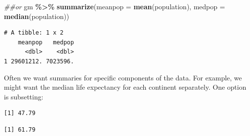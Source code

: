 \documentclass[
]{krantz}
\makeatletter
\newenvironment{Shaded}{\begin{snugshade}}{\end{snugshade}}
\newcommand{\CommentTok}[1]{\textcolor[rgb]{0.37,0.37,0.37}{\textit{#1}}}
\newcommand{\DataTypeTok}[1]{\textcolor[rgb]{0.27,0.27,0.27}{#1}}
\newcommand{\KeywordTok}[1]{\textcolor[rgb]{0.27,0.27,0.27}{\textbf{#1}}}
\newcommand{\NormalTok}[1]{#1}
\newcommand{\OperatorTok}[1]{\textcolor[rgb]{0.43,0.43,0.43}{\textbf{#1}}}
\newcommand{\StringTok}[1]{\textcolor[rgb]{0.5,0.5,0.5}{#1}}
\newenvironment{kframe}{%
\medskip{}
\setlength{\fboxsep}{.8em}
 \def\at@end@of@kframe{}%
 \ifinner\ifhmode%
  \def\at@end@of@kframe{\end{minipage}}%
  \begin{minipage}{\columnwidth}%
 \fi\fi%
 \def\FrameCommand##1{\hskip\@totalleftmargin \hskip-\fboxsep
 \colorbox{shadecolor}{##1}\hskip-\fboxsep
     \hskip-\linewidth \hskip-\@totalleftmargin \hskip\columnwidth}%
 \MakeFramed {\advance\hsize-\width
   \@totalleftmargin\z@ \linewidth\hsize
   \@setminipage}}%
 {\par\unskip\endMakeFramed%
 \at@end@of@kframe}
\renewenvironment{Shaded}{\begin{kframe}}{\end{kframe}}
\makeatother
\begin{document}
\begin{Shaded}
\begin{Highlighting}[]
\CommentTok{\#\#or}
\NormalTok{gm }\OperatorTok{\%\textgreater{}\%}\StringTok{ }
\StringTok{  }\KeywordTok{summarize}\NormalTok{(}\DataTypeTok{meanpop =} \KeywordTok{mean}\NormalTok{(population), }\DataTypeTok{medpop =} \KeywordTok{median}\NormalTok{(population))}
\end{Highlighting}
\end{Shaded}

\begin{verbatim}
# A tibble: 1 x 2
    meanpop   medpop
      <dbl>    <dbl>
1 29601212. 7023596.
\end{verbatim}

Often we want summaries for specific components of the data. For example, we might want the median life expectancy for each continent separately. One option is subsetting:

\begin{Shaded}
\end{Shaded}

\begin{verbatim}
[1] 47.79
\end{verbatim}

\begin{Shaded}
\end{Shaded}

\begin{verbatim}
[1] 61.79
\end{verbatim}

\begin{Shaded}
\end{Shaded}
\end{document}
